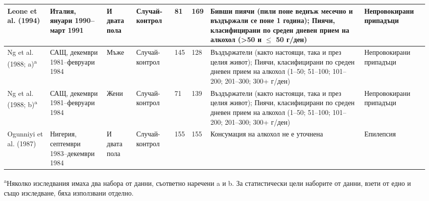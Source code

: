 \documentclass{article}
\begin{document}
\begin{table}
\begin{threeparttable}
\begin{tabular}{|p{2.5cm}|p{3cm}|p{1.5cm}|p{2cm}|p{1cm}|p{1cm}|p{7.5cm}|p{2cm}|}
  Leone et al. (1994) & Италия, януари 1990--март 1991 & И двата пола & Случай-контрол & 81 & 169 & Бивши пиячи (пили поне веднъж месечно и въздържали се поне 1 година); Пиячи, класифицирани по среден дневен прием на алкохол (>50 и $\leq$ 50 г/ден) & Непровокирани припадъци \\ \hline
  Ng et al. (1988; a)\textsuperscript{a} & САЩ, декември 1981--февруари 1984 & Мъже & Случай-контрол & 145 & 128 & Въздържатели (както настоящи, така и през целия живот); Пиячи, класифицирани по среден дневен прием на алкохол (1--50; 51--100; 101--200; 201--300; 300+ г/ден) & Непровокирани припадъци \\ \hline
  Ng et al. (1988; b)\textsuperscript{a} & САЩ, декември 1981--февруари 1984 & Жени & Случай-контрол & 71 & 139 & Въздържатели (както настоящи, така и през целия живот); Пиячи, класифицирани по среден дневен прием на алкохол (1--50; 51--100; 101--200; 201--300; 300+ г/ден) & Непровокирани припадъци \\ \hline
  Ogunniyi et al. (1987) & Нигерия, септември 1983--декември 1984 & И двата пола & Случай-контрол & 155 & 155 & Консумация на алкохол не е уточнена & Епилепсия \\ \hline
  \end{tabular}
  \begin{tablenotes}
  \item \textsuperscript{a}Няколко изследвания имаха два набора от данни, съответно наречени a и b. За статистически цели наборите от данни, взети от едно и също изследване, бяха използвани отделно.
  \end{tablenotes}
  \end{threeparttable}
\end{table}

  \normalsize
\end{document}
